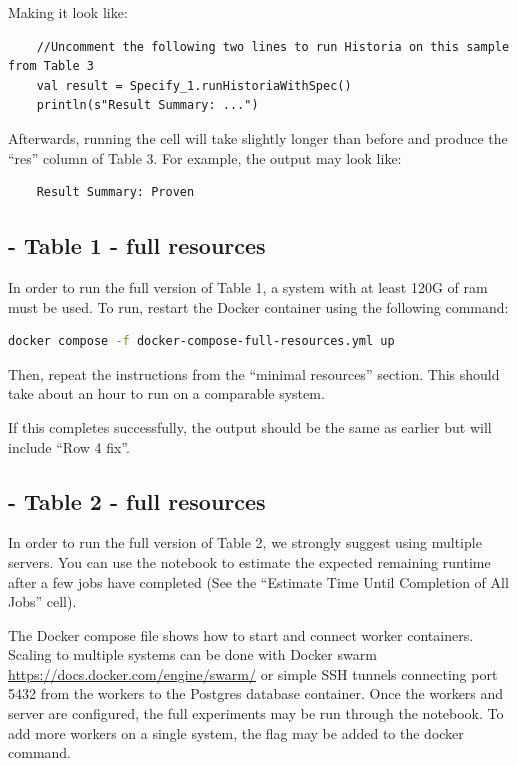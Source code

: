 \documentclass{article} %
\begin{document}
Making it look like: 

\begin{lstlisting}
    //Uncomment the following two lines to run Historia on this sample from Table 3
    val result = Specify_1.runHistoriaWithSpec()
    println(s"Result Summary: ...")
\end{lstlisting}


Afterwards, running the cell will take slightly longer than before  and produce the ``res'' column of Table 3.  For example, the output may look like:

\begin{lstlisting} 
    Result Summary: Proven
\end{lstlisting}


\subsection{ - Table 1 - full resources}

In order to run the full version of Table 1, a system with at least 120G of ram must be used. To run, restart the Docker container using the following command:

\begin{lstlisting}[language=bash]
  docker compose -f docker-compose-full-resources.yml up
\end{lstlisting}

Then, repeat the instructions from the ``minimal resources'' section.  This should take about an hour to run on a comparable system.

If this completes successfully, the output should be the same as earlier but will include ``Row 4 fix''.  

\subsection{ - Table 2 - full resources}

In order to run the full version of Table 2, we strongly suggest using multiple servers.
You can use the  notebook to estimate the expected remaining runtime after a few jobs have completed (See the ``Estimate Time Until Completion of All Jobs'' cell).

The Docker compose file  shows how to start and connect worker containers.  Scaling to multiple systems can be done with Docker swarm \url{https://docs.docker.com/engine/swarm/} or simple SSH tunnels connecting port 5432 from the workers to the Postgres database container. Once the workers and server are configured, the full experiments may be run through the  notebook.  To add more workers on a single system, the  flag may be added to the docker command.
\end{document}
